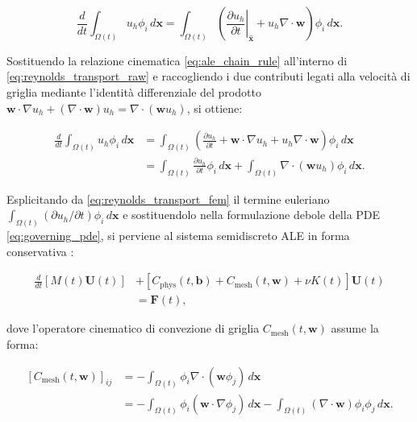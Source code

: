 \begin{equation}
\frac{d}{dt}
\int_{\Omega(t)}
u_h\phi_i\,d\mathbf{x}
=
\int_{\Omega(t)}
\left(
\left.\frac{\partial u_h}{\partial t}\right|_{\widehat{\mathbf{x}}}
+
u_h\nabla\cdot\mathbf{w}
\right)
\phi_i\,d\mathbf{x}.
\label{eq:reynolds_transport_raw}
\end{equation}

Sostituendo la relazione cinematica \eqref{eq:ale_chain_rule} all'interno di \eqref{eq:reynolds_transport_raw} e raccogliendo i due contributi legati alla velocità di griglia mediante l'identità differenziale del prodotto $\mathbf{w}\cdot\nabla u_h + (\nabla\cdot\mathbf{w})u_h = \nabla\cdot(\mathbf{w}u_h)$, si ottiene:

\begin{equation}
\begin{aligned}
\frac{d}{dt}
\int_{\Omega(t)}
u_h\phi_i\,d\mathbf{x}
&=
\int_{\Omega(t)}
\left(
\frac{\partial u_h}{\partial t}
+
\mathbf{w}\cdot\nabla u_h
+
u_h\nabla\cdot\mathbf{w}
\right)
\phi_i\,d\mathbf{x}
\\
&=
\int_{\Omega(t)}
\frac{\partial u_h}{\partial t}\phi_i\,d\mathbf{x}
+
\int_{\Omega(t)}
\nabla\cdot(\mathbf{w}u_h)\phi_i\,d\mathbf{x}.
\end{aligned}
\label{eq:reynolds_transport_fem}
\end{equation}

Esplicitando da \eqref{eq:reynolds_transport_fem} il termine euleriano $\int_{\Omega(t)} (\partial u_h/\partial t)\phi_i\,d\mathbf{x}$ e sostituendolo nella formulazione debole della PDE \eqref{eq:governing_pde}, si perviene al sistema semidiscreto ALE in forma conservativa \citep{farhat2001the,formaggia2004stability}:

\begin{equation}
\begin{aligned}
\frac{d}{dt}
\left[
M(t)\mathbf{U}(t)
\right]
&+
\left[
C_{\mathrm{phys}}(t,\mathbf{b})
+
C_{\mathrm{mesh}}(t,\mathbf{w})
+
\nu K(t)
\right]
\mathbf{U}(t)
\\
&=
\mathbf{F}(t),
\end{aligned}
\label{eq:ale_semidiscrete_conservative}
\end{equation}

dove l'operatore cinematico di convezione di griglia $C_{\mathrm{mesh}}(t,\mathbf{w})$ assume la forma:

\begin{equation}
\begin{aligned}
\left[C_{\mathrm{mesh}}(t,\mathbf{w})\right]_{ij}
&=
-\int_{\Omega(t)}
\phi_i\nabla\cdot(\mathbf{w}\phi_j)\,d\mathbf{x}
\\
&=
-\int_{\Omega(t)}
\phi_i(\mathbf{w}\cdot\nabla\phi_j)\,d\mathbf{x}
-\int_{\Omega(t)}
(\nabla\cdot\mathbf{w})\phi_i\phi_j\,d\mathbf{x}.
\end{aligned}
\label{eq:c_mesh_continuous_split}
\end{equation}

